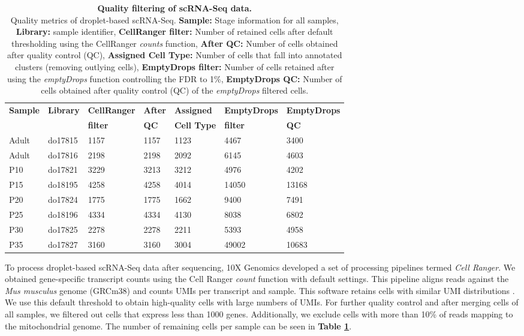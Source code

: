 \begin{table}[ht	]
\centering
\caption[Quality filtering of scRNA-Seq data]{\textbf{Quality filtering of scRNA-Seq data.} \\
Quality metrics of droplet-based scRNA-Seq. \textbf{Sample:} Stage information for all samples, \textbf{Library:} sample identifier, \textbf{CellRanger filter:} Number of retained cells after default thresholding using the CellRanger \emph{counts} function,  \textbf{After QC:} Number of cells obtained after quality control (QC), \textbf{Assigned Cell Type:} Number of cells that fall into annotated clusters (removing outlying cells), \textbf{EmptyDrops filter:} Number of cells retained after using the \emph{emptyDrops} function controlling the FDR to 1\%, \textbf{EmptyDrops QC:} Number of cells obtained after quality control (QC) of the \emph{emptyDrops} filtered cells.}
\label{tab3:QC_scRNAseq}
\begin{tabular}{lllllll}
\toprule
\textbf{Sample} & \textbf{Library} & \textbf{CellRanger} & \textbf{After} & \textbf{Assigned} & \textbf{EmptyDrops} & \textbf{EmptyDrops} \\
& & \textbf{filter} & \textbf{QC} & \textbf{Cell Type} & \textbf{filter} & \textbf{QC} \\
\midrule
Adult & do17815 & 1157 & 1157 & 1123 & 4467 & 3400 \\
\midrule
Adult & do17816 & 2198 & 2198 & 2092 & 6145 & 4603 \\
\midrule
P10 & do17821 & 3229 & 3213 & 3212 & 4976 & 4202 \\
\midrule
P15 & do18195 & 4258 & 4258 & 4014 & 14050 & 13168 \\
\midrule
P20 & do17824 & 1775 & 1775 & 1662 & 9400 & 7491 \\
\midrule
P25 & do18196 & 4334 & 4334 & 4130 & 8038 & 6802 \\
\midrule
P30 & do17825 & 2278 & 2278 & 2211 & 5393 & 4958 \\
\midrule
P35 & do17827 & 3160 & 3160 & 3004 & 49002 & 10683 \\                 
\bottomrule   
\end{tabular}
\end{table}

To process droplet-based scRNA-Seq data after sequencing, 10X Genomics\texttrademark{} developed a set of processing pipelines termed \textit{Cell Ranger}. We obtained gene-specific transcript counts using the Cell Ranger \emph{count} function with default settings. This pipeline aligns reads against the \emph{Mus musculus} genome (GRCm38) and counts UMIs per transcript and sample. This software retains cells with similar UMI distributions \citep{Zheng2017}. We use this default threshold to obtain high-quality cells with large numbers of UMIs. For further quality control and after merging cells of all samples, we filtered out cells that express less than 1000 genes. Additionally, we exclude cells with more than 10\% of reads mapping to the mitochondrial genome. The number of remaining cells per sample can be seen in \textbf{Table \ref{tab3:QC_scRNAseq}}.\\

